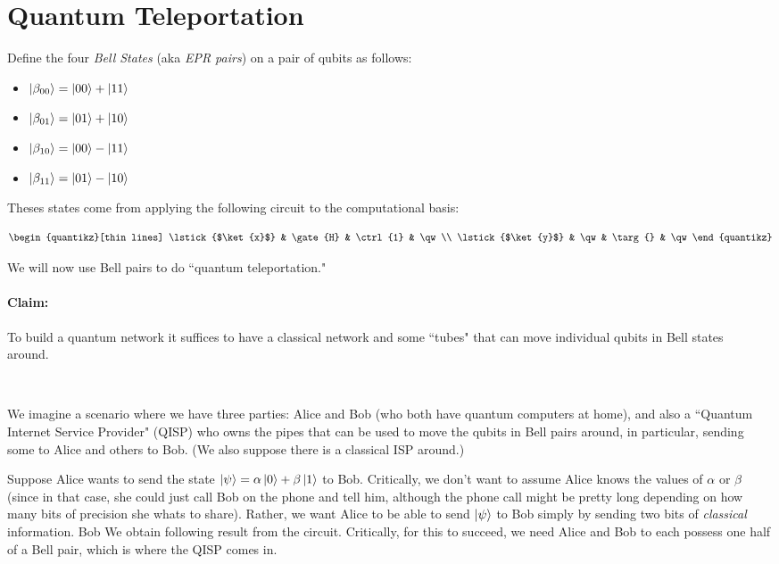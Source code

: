 \documentclass{article}
\begin{document}
\section{Quantum Teleportation}

Define the four \emph{Bell States} (aka \emph{EPR pairs}) on a pair of qubits as follows:
\begin{itemize}
    \item $\ket {\beta_{00}} = \ket{00} + \ket{11}$
    \item $\ket {\beta_{01}} = \ket{01} + \ket{10}$
    \item $\ket {\beta_{10}} = \ket{00} - \ket{11}$
    \item $\ket {\beta_{11}} = \ket{01} - \ket{10}$
\end{itemize}
Theses states come from applying the following circuit to the computational basis:

\[\begin{quantikz}[thin lines] 
        \lstick{$\ket{x}$} & \gate{H} &  \ctrl{1}   &  \qw \\
        \lstick{$\ket{y}$} & \qw & \targ{}  & \qw    
\end{quantikz}\]

We will now use Bell pairs to do ``quantum teleportation."

\paragraph{Claim:} To build a quantum network it suffices to have a classical network and some ``tubes" that can move individual qubits in Bell states around.\

\

We imagine a scenario where we have three parties: Alice and Bob (who both have quantum computers at home), and also a ``Quantum Internet Service Provider" (QISP) who owns the pipes that can be used to move the qubits in Bell pairs around, in particular, sending some to Alice and others to Bob.  (We also suppose there is a classical ISP around.)

Suppose Alice wants to send the state $\ket{\psi} = \alpha\ket{0} + \beta\ket{1}$ to Bob.  Critically, we don't want to assume Alice knows the values of $\alpha$ or $\beta$ (since in that case, she could just call Bob on the phone and tell him, although the phone call might be pretty long depending on how many bits of precision she whats to share).  Rather, we want Alice to be able to send $\ket{\psi}$ to Bob simply by sending two bits of \emph{classical} information.  Bob  We obtain following result from the circuit.  Critically, for this to succeed, we need Alice and Bob to each possess one half of a Bell pair, which is where the QISP comes in.
\end{document}
